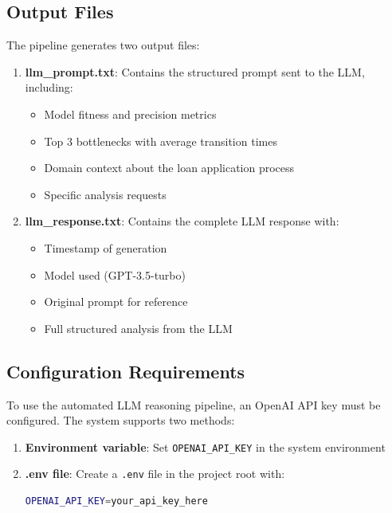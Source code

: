 \documentclass[a4paper,twoside,12pt]{article}
\begin{document}
\subsection{Output Files}

The pipeline generates two output files:

\begin{enumerate}
    \item \textbf{llm\_prompt.txt}: Contains the structured prompt sent to the LLM, including:
    \begin{itemize}
        \item Model fitness and precision metrics
        \item Top 3 bottlenecks with average transition times
        \item Domain context about the loan application process
        \item Specific analysis requests
    \end{itemize}
    
    \item \textbf{llm\_response.txt}: Contains the complete LLM response with:
    \begin{itemize}
        \item Timestamp of generation
        \item Model used (GPT-3.5-turbo)
        \item Original prompt for reference
        \item Full structured analysis from the LLM
    \end{itemize}
\end{enumerate}

\subsection{Configuration Requirements}

To use the automated LLM reasoning pipeline, an OpenAI API key must be configured. The system supports two methods:

\begin{enumerate}
    \item \textbf{Environment variable}: Set \texttt{OPENAI\_API\_KEY} in the system environment
    \item \textbf{.env file}: Create a \texttt{.env} file in the project root with:
    \begin{lstlisting}[language=bash]
OPENAI_API_KEY=your_api_key_here
    \end{lstlisting}
\end{enumerate}
\end{document}
